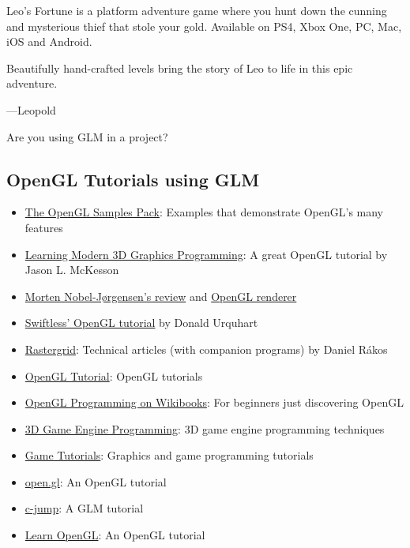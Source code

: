 \documentclass{scrartcl}
\numberwithin{figure}{subsection}
\begin{document}
Leo's Fortune is a platform adventure game where you hunt down the cunning and mysterious thief that stole your gold. Available on PS4, Xbox One, PC, Mac, iOS and Android.

Beautifully hand-crafted levels bring the story of Leo to life in this epic adventure. 



 ---Leopold

Are you using GLM in a project?  

\subsection{OpenGL Tutorials using GLM}

\begin{itemize}
  \item \href{http://www.g-truc.net/project-0026.html#menu}{The OpenGL Samples Pack}: Examples that demonstrate OpenGL's many features
  \item \href{http://www.arcsynthesis.org/gltut/}{Learning Modern 3D Graphics Programming}: A great OpenGL tutorial by Jason L. McKesson
  \item \href{http://blog.nobel-joergensen.com/2011/04/02/glm-brilliant-math-library-for-opengl/}{Morten Nobel-Jørgensen's review} and \href{https://github.com/mortennobel/RenderE}{OpenGL renderer} 
  \item \href{http://www.swiftless.com/opengltuts.html}{Swiftless' OpenGL tutorial} by Donald Urquhart
  \item \href{http://rastergrid.com/blog/}{Rastergrid}: Technical articles (with companion programs) by Daniel Rákos
  \item \href{http://www.opengl-tutorial.org}{OpenGL Tutorial}: OpenGL tutorials
  \item \href{http://en.wikibooks.org/wiki/OpenGL_Programming}{OpenGL Programming on Wikibooks}: For beginners just discovering OpenGL
  \item \href{http://3dgep.com/}{3D Game Engine Programming}: 3D game engine programming techniques
  \item \href{http://www.gametutorials.com/opengl-4-matrices-and-glm/}{Game Tutorials}: Graphics and game programming tutorials 
  \item \href{https://open.gl/}{open.gl}: An OpenGL tutorial
  \item \href{http://www.c-jump.com/bcc/common/Talk3/Math/GLM/GLM.html}{c-jump}: A GLM tutorial
  \item \href{http://learnopengl.com/}{Learn OpenGL}: An OpenGL tutorial
\end{itemize}
\end{document}
